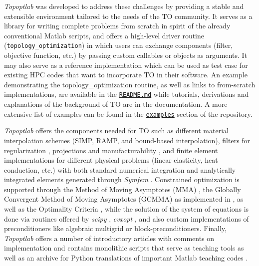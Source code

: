 \documentclass[11pt]{article}
\begin{document}
\textit{Topoptlab} was developed to address these challenges by providing a stable
and extensible environment tailored to the needs of the TO community. It serves
as a library for writing complete problems from scratch in spirit of the
already conventional Matlab scripts, and offers a high-level driver
routine (\texttt{topology\_optimization}) in which users can exchange components
(filter, objective function, etc.) by passing custom callables or objects as
arguments. It may also serve as a reference implementation which can be used as
test case for existing HPC codes that want to incorporate TO in their software.
An example demonstrating the topology\_optimization routine, as well as links to
from-scratch implementations, are available in the \href{https://github.com/stefanhiemer/topoptlab/blob/main/README.md}{\texttt{README.md}}
while tutorials, derivations and explanations of the background of TO are in
the documentation. A more extensive list of examples can be found in the
\href{https://github.com/stefanhiemer/topoptlab/tree/main/examples}{\texttt{examples}}
section of the repository.

\textit{Topoptlab} offers the components needed for TO such as different material
interpolation schemes (SIMP, RAMP, and bound-based interpolation), filters for
regularization \citep{sigmund1997design,bruns2001topology},
projections \citep{guest2004achieving,sigmund2007morphology,xu2010volume} and
manufacturability \citep{langelaar2017additive}, and finite element implementations
for different physical problems (linear elasticity, heat conduction, etc.) with
both standard numerical integration and analytically integrated elements
generated through \textit{Symfem} \citep{scroggs2021symfem}. Constrained optimization is
supported through the Method of Moving Asymptotes (MMA) \citep{svanberg1987},
the Globally Convergent Method of Moving Asymptotes (GCMMA) \citep{svanberg2002class}
as implemented in \citet{deetman2024gcmma}, as well as the Optimality Criteria
\citep{andreassen2011efficient,bendsoe2003topology}, while the solution of
the system of equations is done via routines offered by \textit{scipy} \citep{2020SciPy-NMeth},
\textit{cvxopt} \citep{andersen2020cvxopt}, and also custom implementations of
preconditioners like algebraic multigrid or block-preconditioners. Finally,
\textit{Topoptlab} offers a number of introductory articles with comments on
implementation and contains monolithic scripts that serve as teaching tools as
well as an archive for Python translations of important Matlab teaching codes
\citep[e.g.,][]{andreassen2011efficient,andreassen2014determine}.
\end{document}
